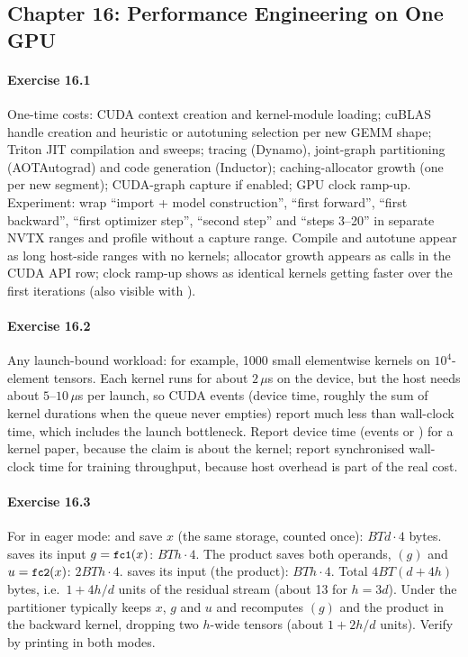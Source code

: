 \subsection*{Chapter 16: Performance Engineering on One GPU}

\paragraph{Exercise 16.1} One-time costs: CUDA context creation and kernel-module loading; cuBLAS
handle creation and heuristic or autotuning selection per new GEMM shape; Triton JIT compilation and
 sweeps;  tracing (Dynamo), joint-graph partitioning
(AOTAutograd) and code generation (Inductor); caching-allocator growth (one  per new
segment); CUDA-graph capture if enabled; GPU clock ramp-up. Experiment: wrap ``import + model
construction'', ``first forward'', ``first backward'', ``first optimizer step'', ``second step'' and
``steps 3--20'' in separate NVTX ranges and profile without a capture range. Compile and autotune
appear as long host-side ranges with no kernels; allocator growth appears as  calls in
the CUDA API row; clock ramp-up shows as identical kernels getting faster over the first iterations
(also visible with ).

\paragraph{Exercise 16.2} Any launch-bound workload: for example, 1000 small elementwise kernels on
$10^4$-element tensors. Each kernel runs for about $2\,\mu$s on the device, but the host needs
about $5$--$10\,\mu$s per launch, so CUDA events (device time, roughly the sum of kernel durations
when the queue never empties) report much less than wall-clock time, which includes the launch
bottleneck. Report device time (events or ) for a kernel paper, because the claim is
about the kernel; report synchronised wall-clock time for training throughput, because host overhead
is part of the real cost.

\paragraph{Exercise 16.3} For  in eager mode:  and
 save $x$ (the same storage, counted once): $BTd\cdot4$ bytes.  saves its input
$g=\texttt{\small fc1}(x)$: $BTh\cdot4$. The product saves both operands, $(g)$ and
$u=\texttt{\small fc2}(x)$: $2BTh\cdot4$.  saves its input (the product): $BTh\cdot4$. Total
$4BT(d+4h)$ bytes, i.e.\ $1+4h/d$ units of the residual stream (about 13 for $h=3d$). Under
 the partitioner typically keeps $x$, $g$ and $u$ and recomputes
$(g)$ and the product in the backward kernel, dropping two $h$-wide tensors (about
$1+2h/d$ units). Verify by printing  in both modes.

